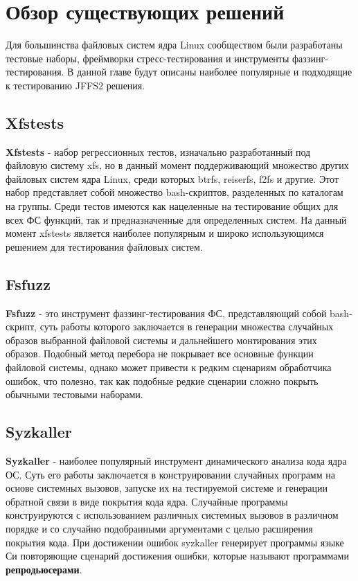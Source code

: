 \section{Обзор существующих решений}
\label{sec:Chapter2} 

Для большинства файловых систем ядра Linux сообществом были разработаны тестовые наборы, фреймворки стресс-тестирования и инструменты фаззинг-тестирования. В данной главе будут описаны наиболее популярные и подходящие к тестированию JFFS2 решения.

\subsection{Xfstests}

\textbf{Xfstests} \cite{xfstests} - набор регрессионных тестов, изначально разработанный под файловую систему xfs, но в данный момент поддерживающий множество других файловых систем ядра Linux, среди которых btrfs, reiserfs, f2fs и другие. Этот набор представляет собой множество bash-скриптов, разделенных по каталогам на группы. Среди тестов имеются как нацеленные на тестирование общих для всех ФС функций, так и предназначенные для определенных систем. На данный момент xfstests является наиболее популярным и широко использующимся решением для тестирования файловых систем.

\subsection{Fsfuzz}

\textbf{Fsfuzz} \cite{fsfuzz}- это инструмент фаззинг-тестирования ФС, представляющий собой bash-скрипт, суть работы которого заключается в генерации множества случайных образов выбранной файловой системы и дальнейшего монтирования этих образов. Подобный метод перебора не покрывает все основные функции файловой системы, однако может привести к редким сценариям обработчика ошибок, что полезно, так как подобные редкие сценарии сложно покрыть обычными тестовыми наборами.

\subsection{Syzkaller}

\textbf{Syzkaller} \cite{syzkaller} - наиболее популярный инструмент динамического анализа кода ядра ОС. Суть его работы заключается в конструировании случайных программ на основе системных вызовов, запуске их на тестируемой системе и генерации обратной связи в виде покрытия кода ядра. Случайные программы конструируются с использованием различных системных вызовов в различном порядке и со случайно подобранными аргументами с целью расширения покрытия кода. При достижении ошибок syzkaller генерирует программы языке Си повторяющие сценарий достижения ошибки, которые называют программами \textbf{репродьюсерами}.

